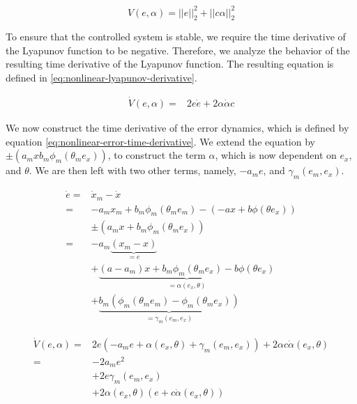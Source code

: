 \begin{equation}
    V(e, \alpha) =||e||_2^2 + ||c \alpha||_2^2
    \label{eq:nonlinear-lyapunov-candidate}
\end{equation}

To ensure that the controlled system is stable, we require the time derivative of the Lyapunov function to be negative. Therefore, we analyze the behavior of the resulting time derivative of the Lyapunov function. The resulting equation is defined in \eqref{eq:nonlinear-lyapunov-derivative}.

\begin{equation}
    \begin{aligned}
    \dot V(e, \alpha) = & 2e\dot e + 2\alpha \dot \alpha c
    \end{aligned}
    \label{eq:nonlinear-lyapunov-derivative}
\end{equation}

We now construct the time derivative of the error dynamics, which is defined by equation \eqref{eq:nonlinear-error-time-derivative}. We extend the equation by $\pm (a_mx b_m \phi_m(\theta_m e_x))$, to construct the term $\alpha$, which is now dependent on $e_x$, and $\theta$. We are then left with two other terms, namely, $-a_me$, and $\gamma_m(e_m, e_x)$.

\begin{equation}
    \begin{aligned}
    \dot e 
= & \dot x_m - \dot x \\ 
= & -a_mx_m + b_m\phi_m(\theta_me_m) - (-ax + b\phi(\theta e_x)) \\
    & \pm (a_mx + b_m \phi_m(\theta_m e_x)) \\
    = & -a_m \underbrace{(x_m-x)}_{=e} \\ 
    & + \underbrace{(a-a_m)x+b_m\phi_m(\theta_me_x) - b\phi(\theta e_x)}_{=\alpha(e_x, \theta)} \\ 
    & + \underbrace{b_m(\phi_m(\theta_m e_m)-\phi_m(\theta_m e_x))}_{=\gamma_m(e_m,e_x)}
    \end{aligned}
    \label{eq:nonlinear-error-time-derivative}
\end{equation}

\begin{equation}
    \begin{aligned}
    \dot V(e, \alpha) 
    = & 2e(-a_me + \alpha(e_x, \theta) + \gamma_m(e_m, e_x)) + 2\alpha c \dot \alpha(e_x, \theta)\\
    = & -2a_me^2 \\ 
    & + 2e\gamma_m(e_m, e_x) 
    \\ 
    & + 2\alpha(e_x, \theta)(e + c \dot \alpha(e_x, \theta))
    \end{aligned}
    \label{eq:nonlinear-lyapunov-derivative2}
\end{equation}

